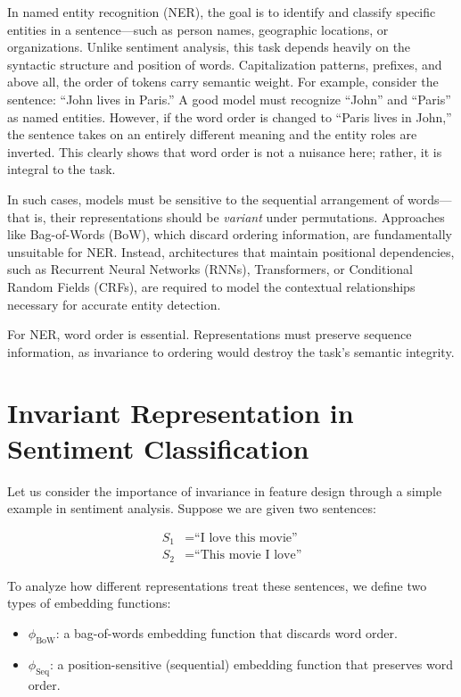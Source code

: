 In named entity recognition (NER), the goal is to identify and classify specific entities in a sentence—such as person names, geographic locations, or organizations. Unlike sentiment analysis, this task depends heavily on the syntactic structure and position of words. Capitalization patterns, prefixes, and above all, the order of tokens carry semantic weight. For example, consider the sentence: ``John lives in Paris.'' A good model must recognize ``John'' and ``Paris'' as named entities. However, if the word order is changed to ``Paris lives in John,'' the sentence takes on an entirely different meaning and the entity roles are inverted. This clearly shows that word order is not a nuisance here; rather, it is integral to the task.

In such cases, models must be sensitive to the sequential arrangement of words—that is, their representations should be \textit{variant} under permutations. Approaches like Bag-of-Words (BoW), which discard ordering information, are fundamentally unsuitable for NER. Instead, architectures that maintain positional dependencies, such as Recurrent Neural Networks (RNNs), Transformers, or Conditional Random Fields (CRFs), are required to model the contextual relationships necessary for accurate entity detection.

\begin{tcolorbox}[colback=gray!10, colframe=black, title=Takeaway]
	For NER, word order is essential. Representations must preserve sequence information, as invariance to ordering would destroy the task’s semantic integrity.
\end{tcolorbox}

\section*{Invariant Representation in Sentiment Classification}

Let us consider the importance of invariance in feature design through a simple example in sentiment analysis. Suppose we are given two sentences:

\begin{align*}
	S_1 &= \text{``I love this movie''} \\
	S_2 &= \text{``This movie I love''}
\end{align*}

To analyze how different representations treat these sentences, we define two types of embedding functions:
\begin{itemize}
	\item $\phi_{\text{BoW}}$: a bag-of-words embedding function that discards word order.
	\item $\phi_{\text{Seq}}$: a position-sensitive (sequential) embedding function that preserves word order.
\end{itemize}

